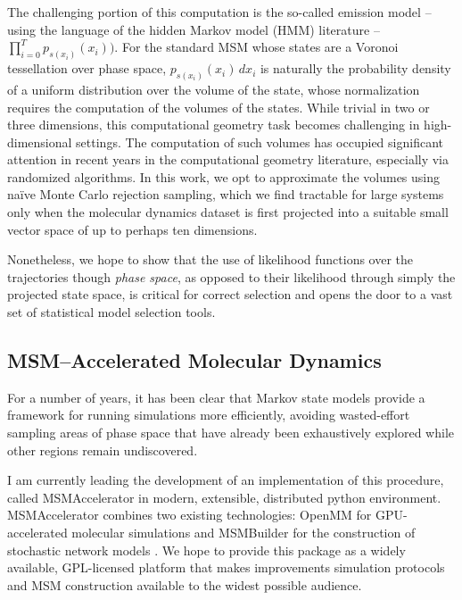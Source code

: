 \documentclass[twocolumn,floatfix,nofootinbib,aps]{revtex4-1}
\begin{document}
The challenging portion of this computation is the so-called emission model -- using the language of the hidden Markov model (HMM) literature\cite{Rabiner1986Introduction} -- $\prod_{i=0}^{T} p_{s(x_i)}(x_{i}))$. For the standard MSM whose states are a Voronoi tessellation over phase space, $p_{s(x_i)}(x_i) \, dx_i$ is naturally the probability density of a uniform distribution over the volume of the state, whose normalization requires the computation of the volumes of the states. While trivial in two or three dimensions, this computational geometry task becomes challenging in high-dimensional settings. The computation of such volumes has occupied significant attention in recent years in the computational geometry literature, especially via randomized algorithms\cite{Kannan97, Simonovits03, Lovasz03}. In this work, we opt to approximate the volumes using na\"{i}ve Monte Carlo rejection sampling, which we find tractable for large systems only when the molecular dynamics dataset is first projected into a suitable small vector space of up to perhaps ten dimensions.

Nonetheless, we hope to show that the use of likelihood functions over the trajectories though \emph{phase space}, as opposed to their likelihood through simply the projected state space, is critical for correct selection and opens the door to a vast set of statistical model selection tools.

\subsection{MSM--Accelerated Molecular Dynamics}
For a number of years, it has been clear that Markov state models provide a framework for running simulations more efficiently, avoiding wasted-effort sampling areas of phase space that have already been exhaustively explored while other regions remain undiscovered\cite{Bowman2010Enhanced, Weber2011Characterization}.

I am currently leading the development of an implementation of this procedure, called MSMAccelerator in modern, extensible, distributed python environment. MSMAccelerator combines two existing technologies: OpenMM for GPU-accelerated molecular simulations\cite{Eastman2013OpenMM} and MSMBuilder for the construction of stochastic network models \cite{Beauchamp:2011he}. We hope to provide this package as a widely available, GPL-licensed platform that makes improvements simulation protocols and MSM construction available to the widest possible audience.
\end{document}
